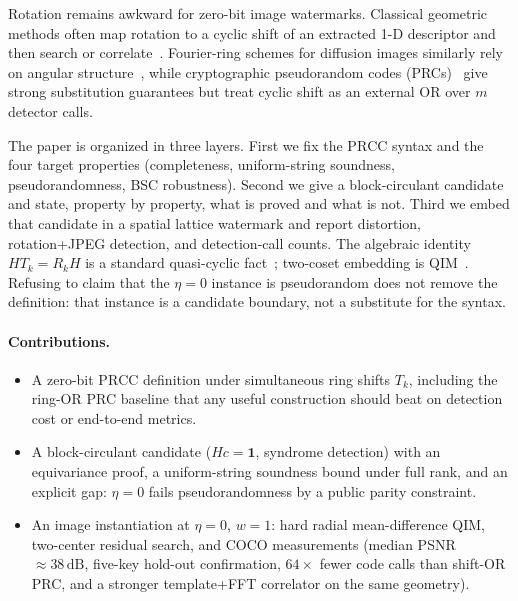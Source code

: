 \documentclass[11pt,a4paper]{article}
\newcommand{\PRCC}{\ensuremath{\mathrm{PRCC}}}
\begin{document}
Rotation remains awkward for zero-bit image watermarks.
Classical geometric methods often map rotation to a cyclic shift of an extracted
1-D descriptor and then search or correlate~\cite{lin2001rst}.
Fourier-ring schemes for diffusion images similarly rely on angular
structure~\cite{wen2023treering,ci2024ringid}, while cryptographic pseudorandom
codes (PRCs)~\cite{christ2024prc,gunn2024undetectable} give strong substitution
guarantees but treat cyclic shift as an external OR over \(m\) detector calls.

The paper is organized in three layers.
First we fix the \PRCC{} syntax and the four target properties (completeness,
uniform-string soundness, pseudorandomness, BSC robustness).
Second we give a block-circulant candidate and state, property by property, what
is proved and what is not.
Third we embed that candidate in a spatial lattice watermark and report distortion,
rotation+JPEG detection, and detection-call counts.
The algebraic identity \(HT_k=R_kH\) is a standard quasi-cyclic
fact~\cite{townsend1967cyclic,fossorier2004qc}; two-coset embedding is
QIM~\cite{chen2001qim}.
Refusing to claim that the \(\eta=0\) instance is pseudorandom does not remove the
definition: that instance is a candidate boundary, not a substitute for the syntax.

\paragraph{Contributions.}
\begin{itemize}[leftmargin=*]
  \item A zero-bit \PRCC{} definition under simultaneous ring shifts \(T_k\),
        including the ring-OR PRC baseline that any useful construction should beat
        on detection cost or end-to-end metrics.
  \item A block-circulant candidate (\(Hc=\mathbf{1}\), syndrome detection) with an
        equivariance proof, a uniform-string soundness bound under full rank, and an
        explicit gap: \(\eta=0\) fails pseudorandomness by a public parity constraint.
  \item An image instantiation at \(\eta=0\), \(w=1\): hard radial mean-difference
        QIM, two-center residual search, and COCO measurements (median PSNR
        \(\approx 38\,\mathrm{dB}\), five-key hold-out confirmation, \(64\times\)
        fewer code calls than shift-OR PRC, and a stronger template+FFT correlator
        on the same geometry).
\end{itemize}
\end{document}
